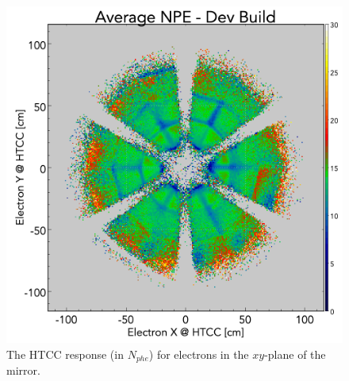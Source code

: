 \begin{figure}[!ht]
    \centering
    \includegraphics[width=1.0\linewidth,trim={0.0cm 0.0cm 0.0cm 1.67cm},clip]{images/avgNPE_Theta_Phi_Dev_Build-2_NO_HOLES.png}
    \caption{The HTCC response (in $N_{phe}$) for electrons in the $xy$-plane of the mirror.}
    \label{fig:avgNPE_Theta_Phi_Dev_Build-2_NO_HOLES}
\end{figure}


